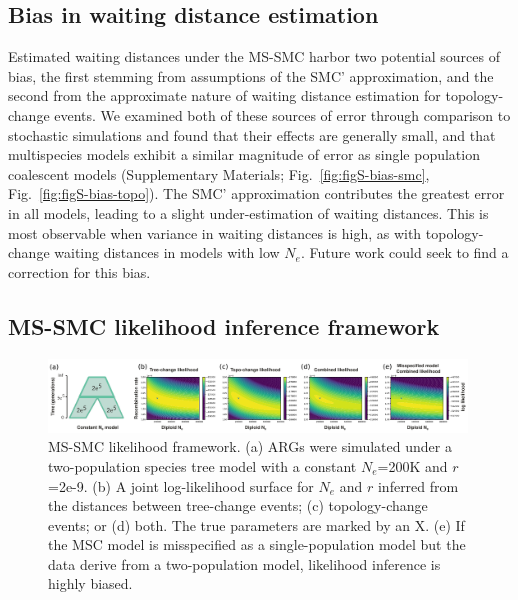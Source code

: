 \documentclass[11pt]{article}
\begin{document}
\subsection{Bias in waiting distance estimation}
Estimated waiting distances under the MS-SMC harbor two potential sources of bias, 
the first stemming from assumptions of the SMC' approximation, and the second from 
the approximate nature of waiting distance estimation for topology-change events. 
We examined both of these sources of error through comparison to stochastic simulations
and found that their effects are generally small, and that multispecies models exhibit 
a similar magnitude of error as single population coalescent models 
(Supplementary Materials; Fig.~\ref{fig:figS-bias-smc}, Fig.~\ref{fig:figS-bias-topo}).
The SMC' approximation contributes the greatest error in all models, leading to 
a slight under-estimation of waiting distances. This is most observable when variance
in waiting distances is high, as with topology-change waiting distances in models 
with low $N_e$. Future work could seek to find a correction for this bias.


\subsection{MS-SMC likelihood inference framework}

\begin{figure}[t]
	\centering
	\includegraphics[width=0.99\textwidth]{figures/likelihood-figure3.pdf}
	\caption{
		MS-SMC likelihood framework. (a) ARGs were simulated under a
		two-population species tree model with a constant $N_e$=200K and 
		$r$=2e-9. (b) A joint log-likelihood surface for $N_e$ and 
		$r$ inferred from the distances between tree-change events; 
		(c) topology-change events; or (d) both. The true parameters are
		marked by an X. (e) If the MSC model is
		misspecified as a single-population model but the data derive from 
		a two-population model, likelihood inference	is highly biased.
	}
	\label{fig:fig-likelihood}
\end{figure}
\end{document}
